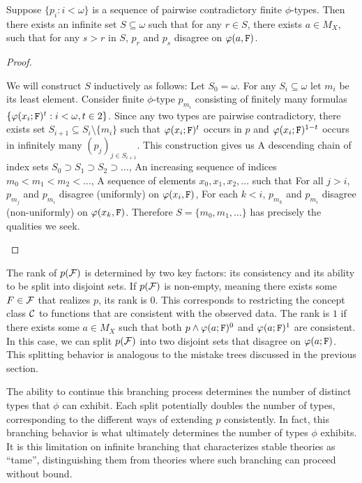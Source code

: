 \begin{lemma}
\label{lem:infSet}
    Suppose $\{p_i : i<\omega\}$ is a sequence of pairwise contradictory finite $\phi$-types. Then there exists an infinite set $S\subseteq \omega$ such that for any $r\in S$, there exists $a\in M_X$, such that for any $s>r$ in $S$, $p_r$ and $p_s$ disagree on $\varphi(a,\texttt{F})$.
\end{lemma}
\begin{proof}
    \begin{outline}
    \0 We will construct $S$ inductively as follows: 
        \1 Let $S_0 = \omega$.
        \1 For any $S_i\subseteq \omega$ let $m_i$ be its least element. 
            \2 Consider finite $\phi$-type $p_{m_i}$ consisting of finitely many formulas $\{\varphi(x_i;\texttt{F})^t : i<\omega, t\in 2\}$. 
            \2 Since any two types are pairwise contradictory, there exists set $S_{i+1}\subseteq S_i\setminus \{m_i\}$ such that $\varphi(x_i;\texttt{F})^t$ occurs in $p$ and $\varphi(x_i;\texttt{F})^{1-t}$ occurs in infinitely many $(p_j)_{j\in S_{i+1}}$. 
        \1 This construction gives us 
            \2 A descending chain of index sets $S_0 \supset S_1 \supset S_2 \supset \ldots$, 
            \2 An increasing sequence of indices $m_0 < m_1 < m_2 < \ldots$,
            \2 A sequence of elements $x_0,x_1,x_2,\ldots$ 
        \1[] such that 
            \2 For all $j>i$, $p_{m_j}$ and $p_{m_i}$ disagree (uniformly) on $\varphi(x_i,\texttt{F})$,
            \2 For each $k<i$, $p_{m_k}$ and $p_{m_i}$ disagree (non-uniformly) on $\varphi(x_k,\texttt{F})$.
    \0 Therefore $S=\{m_0,m_1,\ldots\}$ has precisely the qualities we seek.
    \end{outline}
\end{proof}

The rank of $p(\mathcal{F})$ is determined by two key factors: its consistency and its ability to be split into disjoint sets. If $p(\mathcal{F})$ is non-empty, meaning there exists some $F\in\mathcal{F}$ that realizes $p$, its rank is $0$. This corresponds to restricting the concept class $\mathcal{C}$ to functions that are consistent with the observed data. 
The rank is $1$ if there exists some $a\in M_X$ such that both $p\land \varphi(a;\texttt{F})^0$ and $\varphi(a;\texttt{F})^1$ are consistent. In this case, we can split $p(\mathcal{F})$ into two disjoint sets that disagree on $\varphi(a;\texttt{F})$. This splitting behavior is analogous to the mistake trees discussed in the previous section. 

The ability to continue this branching process determines the number of distinct types that $\phi$ can exhibit. Each split potentially doubles the number of types, corresponding to the different ways of extending $p$ consistently. In fact, this branching behavior is what ultimately determines the number of types $\phi$ exhibits. It is this limitation on infinite branching that characterizes stable theories as \enquote{tame}, distinguishing them from theories where such branching can proceed without bound.

